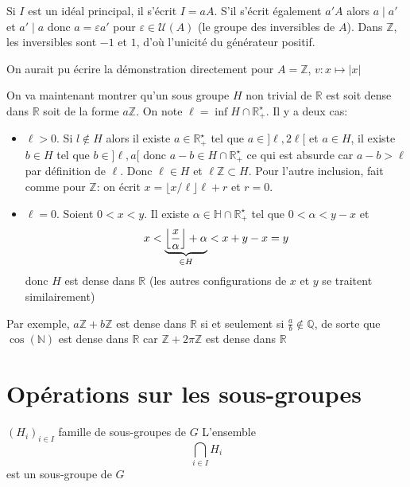 \begin{rem}
    Si $I$ est un idéal principal, il s'écrit $I=aA$. S'il s'écrit également $a'A$ alors $a\;|\;a'$ et $a'\;|\;a$ donc $a=\varepsilon a'$ pour $\varepsilon\in\mathcal U(A)$ (le groupe des inversibles de $A$). Dans $\mathbb Z$, les inversibles sont $-1$ et $1$, d'où l'unicité du générateur positif.
\end{rem}

\begin{rem}
    On aurait pu écrire la démonstration directement pour $A=\mathbb Z$, $v:x\mapsto |x|$
\end{rem}

On va maintenant montrer qu'un sous groupe $H$ non trivial de $\mathbb R$ est soit dense dans $\mathbb R$ soit de la forme $a\mathbb Z$. On note $\ell=\inf H\cap \mathbb R_+^\star$. Il y a deux cas: \begin{itemize}
    \item $\ell>0$. Si $l\not\in H$ alors il existe $a\in\mathbb R_+^\star$ tel que $a\in ]\ell, 2\ell[$ et $a\in H$, il existe $b\in H$ tel que $b\in ]\ell, a[$ donc $a-b\in H\cap \mathbb R_+^\star$ ce qui est absurde car $a-b>\ell$ par définition de $\ell$. Donc $\ell \in H$ et $\ell \mathbb Z\subset H$. Pour l'autre inclusion, fait comme pour $\mathbb Z$: on écrit $x=\lfloor x/\ell \rfloor \ell + r$ et $r=0$.
    \item $\ell=0$. Soient $0<x<y$. Il existe $\alpha\in\mathbb H\cap \mathbb R_+^\star$ tel que $0<\alpha<y-x$ et \[
            x<\underbrace{\left\lfloor\frac x\alpha\right\rfloor+\alpha}_{\in H}<x+y-x=y
        \]
        donc $H$ est dense dans $\mathbb R$ (les autres configurations de $x$ et $y$ se traitent similairement)
\end{itemize}

Par exemple, $a\mathbb Z+b\mathbb Z$ est dense dans $\mathbb R$ si et seulement si $\frac ab\not\in \mathbb Q$, de sorte que $ \cos(\mathbb N) $ est dense dans $\mathbb R$ car $\mathbb Z+2\pi\mathbb Z$ est dense dans $\mathbb R$

\section{Opérations sur les sous-groupes}

\begin{prop}
    \Hyp $(H_i)_{i\in I}$ famille de sous-groupes de $G$
    \Conc L'ensemble \[
        \bigcap_{i\in I}H_i
    \]
    est un sous-groupe de $G$
\end{prop}

